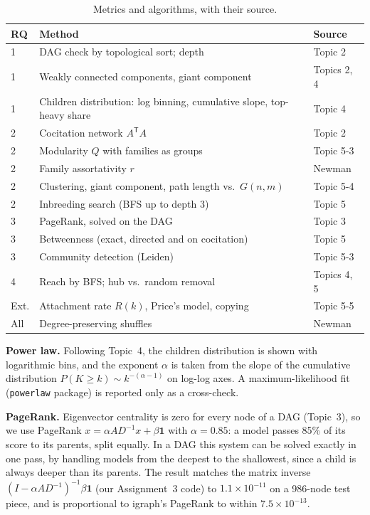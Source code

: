 \documentclass[conference]{IEEEtran}
\begin{document}
\begin{table}[t]
\caption{Metrics and algorithms, with their source.}
\label{tab:methods}
\centering
\footnotesize
\setlength{\tabcolsep}{3pt}
\begin{tabular}{@{}p{0.9cm}p{4.6cm}p{2.1cm}@{}}
\toprule
RQ & Method & Source \\
\midrule
1 & DAG check by topological sort; depth & Topic 2 \\
1 & Weakly connected components, giant component & Topics 2, 4 \\
1 & Children distribution: log binning, cumulative slope, top-heavy share & Topic 4 \\
2 & Cocitation network $A^{\mathsf T}A$ & Topic 2 \\
2 & Modularity $Q$ with families as groups & Topic 5-3 \\
2 & Family assortativity $r$ & Newman \cite{newman2010} \\
2 & Clustering, giant component, path length vs.\ $G(n,m)$ & Topic 5-4 \\
2 & Inbreeding search (BFS up to depth 3) & Topic 5 \\
3 & PageRank, solved on the DAG & Topic 3 \\
3 & Betweenness (exact, directed and on cocitation) & Topic 5 \\
3 & Community detection (Leiden) & Topic 5-3 \\
4 & Reach by BFS; hub vs.\ random removal & Topics 4, 5 \\
Ext. & Attachment rate $R(k)$, Price's model, copying & Topic 5-5 \\
All & Degree-preserving shuffles & Newman \cite{newman2010} \\
\bottomrule
\end{tabular}
\end{table}

\textbf{Power law.} Following Topic~4, the children distribution is shown with
logarithmic bins, and the exponent $\alpha$ is taken from the slope of the
cumulative distribution $P(K\ge k)\sim k^{-(\alpha-1)}$ on log-log axes. A
maximum-likelihood fit (\texttt{powerlaw} package) is reported only as a
cross-check.

\textbf{PageRank.} Eigenvector centrality is zero for every node of a DAG
(Topic~3), so we use PageRank $x = \alpha A D^{-1}x + \beta\mathbf{1}$ with
$\alpha=0.85$: a model passes 85\% of its score to its parents, split equally.
In a DAG this system can be solved exactly in one pass, by handling models from
the deepest to the shallowest, since a child is always deeper than its parents.
The result matches the matrix inverse $(I-\alpha AD^{-1})^{-1}\beta\mathbf{1}$
(our Assignment~3 code) to $1.1\times10^{-11}$ on a 986-node test piece, and is
proportional to igraph's PageRank to within $7.5\times10^{-13}$.
\end{document}
